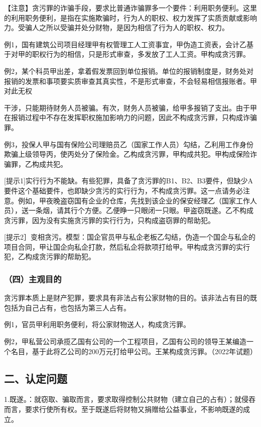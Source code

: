 【注意】贪污罪的诈骗手段，要求比普通诈骗罪多一个要件：利用职务便利。这里的利用职务便利，是指在实施欺骗时，行为人的职权、权力发挥了实质贡献或影响力。受骗人之所以受骗并处分财物，是因为相信了行为人的职权、权力。

例1，国有建筑公司项目经理甲有权管理工人工资事宜，甲伪造工资表，会计乙基于对甲的职权行为的相信，只是形式审查，多发放了工人工资。甲构成贪污罪。

例2，某个科员甲出差，拿着假发票回到单位报销。单位的报销制度是，财务处对报销的发票和事项要实质审查其真实性，不是形式审查，不会轻易相信报账者。甲对此无权

干涉，只能期待财务人员被骗。有次，财务人员被骗，给甲多报销了支出。由于甲在报销过程中不存在发挥职权施加影响力的问题，因此不构成贪污罪，只构成诈骗罪。

例3，投保人甲与国有保险公司理赔员乙（国家工作人员）勾结，乙利用工作身份欺骗上级领导丙，使丙处分了保险金。乙构成贪污罪，甲构成共犯。甲构成保险诈骗罪，乙构成共犯。

[提示1]实行行为不能缺。有些犯罪，具备了贪污罪的B1、B2、B3要件，但缺少A要件这个基础要件，也即缺少贪污的实行行为，不构成贪污罪。这一点请务必注意。例如，甲夜晚盗窃国有企业的仓库，先找到该企业的保安经理乙（国家工作人员），送一条烟，请其行个方便。乙便睁一只眼闭一只眼。甲盗窃既遂。乙不构成贪污罪，因为没有实施贪污罪的实行行为，只构成盗窃罪的帮助犯。

[提示2］变相贪污。模型：国企官员甲与私企老板乙勾结，伪造一个国企与私企的项目合同，甲让国企向私企打款，然后私企将款项打给甲。甲构成贪污罪的实行犯，乙构成贪污罪的帮助犯。

\subsubsection*{（四）主观目的}

贪污罪本质上是财产犯罪，要求具有非法占有公家财物的目的。该非法占有目的既包括为自己占有，也包括为第三人占有。

例1，官员甲利用职务便利，将公家财物送人，构成贪污罪。

例2，甲私营公司承揽乙国有公司的一个工程项目，乙国有公司的领导王某编造一个名目，基于此将乙公司的200万元打给甲公司。王某构成贪污罪。（2022年试题）

\subsection*{二、认定问题}

1.既遂。：就窃取、骗取而言，要求取得控制公共财物（建立自己的占有）；就侵吞而言，要求行使所有权。至于既遂后将财物又捐赠给公益事业，不影响既遂的成立。


